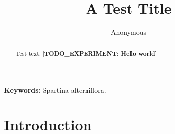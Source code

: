 \documentclass[11pt]{article}
\title{A Test Title}
\author{Anonymous}
\date{}
\newcommand{\TODOEXP}[1]{\textcolor{todocolor}{\textbf{[TODO_EXPERIMENT: #1]}}}
\begin{document}
\maketitle

\begin{abstract}
Test text. \TODOEXP{Hello world}
\end{abstract}

\textbf{Keywords:} Spartina alterniflora.

\section{Introduction}





\end{document}
